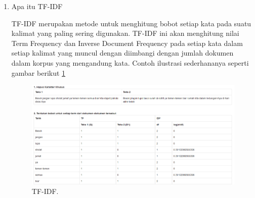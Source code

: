 \begin{enumerate}
\item Apa itu TF-IDF \par
TF-IDF merupakan metode untuk menghitung bobot setiap kata pada suatu kalimat yang paling sering digunakan. TF-IDF ini akan menghitung nilai Term Frequency dan Inverse Document Frequency pada setiap kata dalam setiap kalimat yang muncul dengan diimbangi dengan jumlah dokumen dalam korpus yang mengandung kata. Contoh ilustrasi sederhananya seperti gambar berikut \ref{Teks6}
		\begin{figure}[ht]
		\centerline{\includegraphics[width=1\textwidth]{figures/im/teks6.png}}
		\caption{TF-IDF.}
		\label{Teks6}
		\end{figure}
\end{enumerate}

